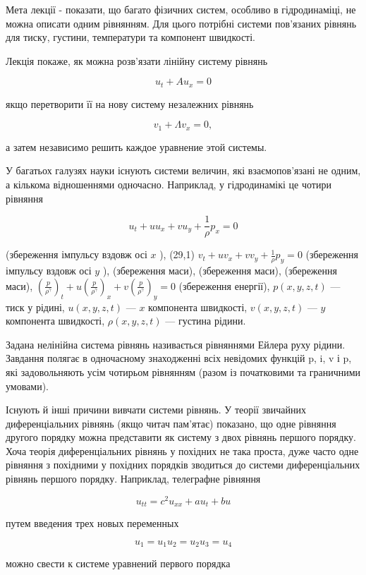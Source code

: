 \documentclass[
  ukrainian,
]{article}
\begin{document}
Мета лекції - показати, що багато фізичних систем, особливо в
гідродинаміці, не можна описати одним рівнянням. Для цього потрібні
системи пов'язаних рівнянь для тиску, густини, температури та компонент
швидкості.

Лекція покаже, як можна розв'язати лінійну систему рівнянь

\[
u_t + Au_x = 0
\]

якщо перетворити її на нову систему незалежних рівнянь

\[
v_1 + \Lambda v_x = 0,
\]

а затем независимо решить каждое уравнение этой системы.

У багатьох галузях науки існують системи величин, які взаємопов'язані не
одним, а кількома відношеннями одночасно. Наприклад, у гідродинамікі це
чотири рівняння

\[
u_t + uu_x + vu_y + \frac{1}{\rho} p_x = 0
\]

(збереження імпульсу вздовж осі \(x\) ), (29,1)
\(v_t + uv_x + vv_y + \frac{1}{\rho} p_y = 0\) (збереження імпульсу
вздовж осі \(y\) ), (збереження маси), (збереження маси), (збереження
маси),
\(\left(\frac{p}{\rho^{\gamma}}\right)_t + u\left(\frac{p}{\rho^{\gamma}}\right)_x + v\left(\frac{p}{\rho^{\gamma}}\right)_y = 0\)
(збереження енергії), \(p(x, y, z, t)\) --- тиск у рідині,
\(u(x, y, z, t)\) --- \(x\) компонента швидкості, \(v(x, y, z, t)\) ---
\(y\) компонента швидкості, \(\rho(x, y, z, t)\) --- густина рідини.

Задана нелінійна система рівнянь називається рівняннями Ейлера руху
рідини. Завдання полягає в одночасному знаходженні всіх невідомих
функцій p, i, v і p, які задовольняють усім чотирьом рівнянням (разом із
початковими та граничними умовами).

Існують й інші причини вивчати системи рівнянь. У теорії звичайних
диференціальних рівнянь (якщо читач пам'ятає) показано, що одне рівняння
другого порядку можна представити як систему з двох рівнянь першого
порядку. Хоча теорія диференціальних рівнянь у похідних не така проста,
дуже часто одне рівняння з похідними у похідних порядків зводиться до
системи диференціальних рівнянь першого порядку. Наприклад, телеграфне
рівняння

\[
u_{tt} = c^2 u_{xx} + a u_t + b u
\]

путем введения трех новых переменных

\[
u_1 = u_1
u_2 = u_2
u_3 = u_4
\]

можно свести к системе уравнений первого порядка
\end{document}
